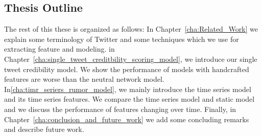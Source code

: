  
\subsection{Thesis Outline}

The rest of this these is organized as follows: In Chapter~\ref{cha:Related_Work} we explain some terminology of Twitter and some techniques which we use for extracting feature and modeling. in Chapter~\ref{cha:single_tweet_creditbility_scoring_model}, we introduce our single tweet credibility model. We show the performance of models with handcrafted features are worse than the neutral network model. In\ref{cha:timr_seriers_rumor_model}, we mainly introduce the time series model and its time series features. We compare the time series model and static model and we discuss the performance of features changing over time. Finally, in Chapter~\ref{cha:conclusion_and_future_work} we add some concluding remarks and describe future work.

